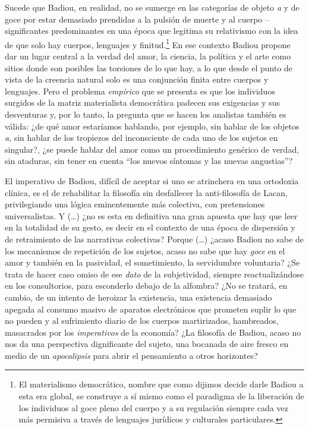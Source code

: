 Sucede que Badiou, en realidad, no se sumerge en las categorías de objeto \emph{a} y de goce por estar demasiado prendidas a la pulsión de muerte y al cuerpo --significantes predominantes en una época que legitima su relativismo con la idea de que solo hay cuerpos, lenguajes y finitud.\footnote{El materialismo democrático, nombre que como dijimos decide darle Badiou a esta era global, se construye a sí mismo como el paradigma de la liberación de los individuos al goce pleno del cuerpo y a su regulación siempre cada vez más permisiva a través de lenguajes jurídicos y culturales particulares.} En ese contexto Badiou propone dar un lugar central a la verdad del amor, la ciencia, la política y el arte como sitios donde son posibles las torsiones de lo que hay, a lo que desde el punto de vista de la creencia natural solo es una conjunción finita entre cuerpos y lenguajes. Pero el problema \emph{empírico} que se presenta es que los individuos surgidos de la matriz materialista democrática padecen sus exigencias y sus desventuras y, por lo tanto, la pregunta que se hacen los analistas también es válida: ¿de qué amor estaríamos hablando, por ejemplo, sin hablar de los objetos \emph{a}, sin hablar de los tropiezos del inconsciente de cada uno de los sujetos en singular?, ¿se puede hablar del amor como un procedimiento genérico de verdad, sin ataduras, sin tener en cuenta \enquote{los nuevos síntomas y las nuevas angustias}?

El imperativo de Badiou, difícil de aceptar si uno se atrinchera en una ortodoxia clínica, es el de rehabilitar la filosofía sin desfallecer la anti-filosofía de Lacan, privilegiando una lógica eminentemente más colectiva, con pretensiones universalistas. Y (\ldots)  ¿no es esta en definitiva una gran apuesta que hay que leer en la totalidad de su gesto, es decir en el contexto de una época de dispersión y de retraimiento de las narrativas colectivas? Porque (\ldots)  ¿acaso Badiou no sabe de los mecanismos de repetición de los sujetos, acaso no sabe que hay \emph{goce} en el amor y también en la pasividad, el sometimiento, la servidumbre voluntaria? ¿Se trata de hacer caso omiso de ese \emph{dato} de la subjetividad, siempre reactualizándose en los consultorios, para esconderlo debajo de la alfombra? ¿No se tratará, en cambio, de un intento de heroizar la existencia, una existencia demasiado apegada al consumo masivo de aparatos electrónicos que prometen suplir lo que no pueden y al sufrimiento diario de los cuerpos martirizados, hambreados, masacrados por los \emph{imperativos} de la economía? ¿La filosofía de Badiou, acaso no nos da una perspectiva dignificante del sujeto, una bocanada de aire fresco en medio de un \emph{apocalipsis} para abrir el pensamiento a otros horizontes?

